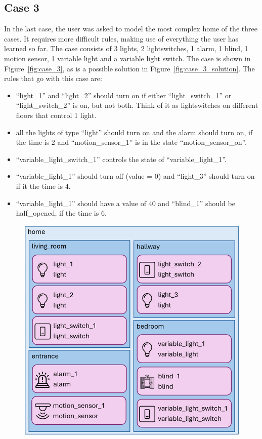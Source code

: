\documentclass[11pt,a4paper]{report}
\begin{document}
\begin{idplisting}
\subsection{Case 3}
In the last case, the user was asked to model the most complex home of the three cases. It requires more difficult rules, making use of everything the user has learned so far. The case consists of 3 lights, 2 lightswitches, 1 alarm, 1 blind, 1 motion sensor, 1 variable light and a variable light switch. The case is shown in Figure~\ref{fig:case_3}, as is a possible solution in Figure~\ref{fig:case_3_solution}. The rules that go with this case are:
\begin{itemize}
    \item ``light\_1''  and ``light\_2'' should turn on if either ``light\_switch\_1'' or ``light\_switch\_2'' is on, but not both. Think of it as lightswitches on different floors that control 1 light.
    \item all the lights of type ``light'' should turn on and the alarm should turn on, if the time is 2 and ``motion\_sensor\_1'' is in the state ``motion\_sensor\_on''.
    \item ``variable\_light\_switch\_1'' controls the state of ``variable\_light\_1''.
    \item ``variable\_light\_1'' should turn off (value = 0) and ``light\_3'' should turn on if it the time is 4.
    \item ``variable\_light\_1'' should have a value of 40 and ``blind\_1'' should be half\_opened, if the time is 6.
\end{itemize}
\begin{figure}
    \centering
    \includegraphics[width=0.8\linewidth]{images/case_3.png}

\end{figure}
\end{idplisting}
\end{document}
